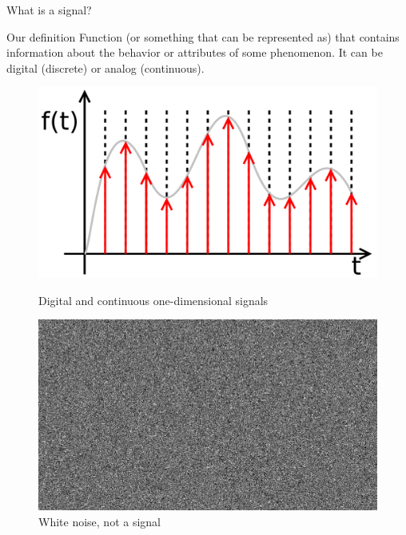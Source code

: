 \begin{frame}{What is a signal?}
\begin{block}{Our definition}
Function (or something that can be represented as) that contains information about the behavior or attributes of some phenomenon. It can be digital (discrete) or analog (continuous).
\end{block}
\pause
\begin{figure}[!tbp]
  \centering
  \begin{minipage}[b]{0.45\textwidth}
    \includegraphics[width=\textwidth]{./Images/digita_signal.png}
    \caption{Digital and continuous one-dimensional signals}
  \end{minipage}
	\pause
  \hfill
  \begin{minipage}[b]{0.45\textwidth}
    \includegraphics[width=\textwidth]{./Images/white_noise.jpg}
    \caption{White noise, not a signal}
  \end{minipage}
\end{figure}
\end{frame}

